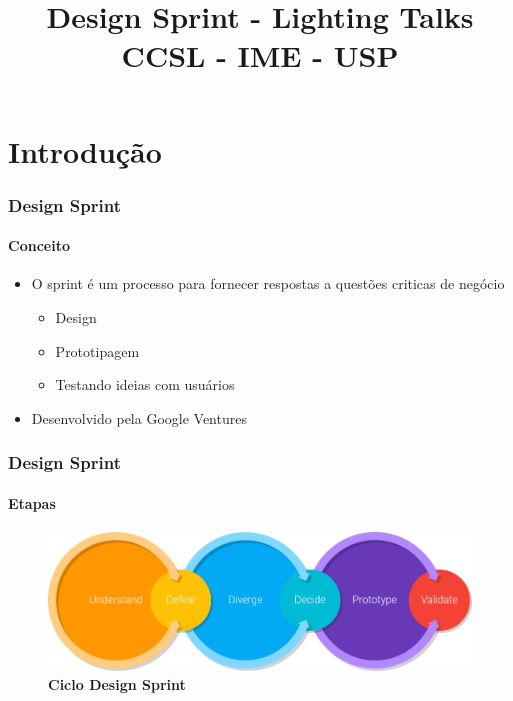 \documentclass{beamer}
\title{
  \textbf{Design Sprint - Lighting Talks} \\
  CCSL - IME - USP
}
\begin{document}
\maketitle

\section{Introdução}

\begin{frame}
  \frametitle{Design Sprint}
  \framesubtitle{Conceito}

  \begin{itemize}
    \item O sprint é um processo para fornecer respostas a questões criticas de negócio
      \begin{itemize}
        \item Design
          \vspace{.25cm}
        \item Prototipagem
          \vspace{.25cm}
        \item Testando ideias com usuários
      \end{itemize}
      \vspace{.5cm}
    \item Desenvolvido pela Google Ventures
  \end{itemize}
\end{frame}

\begin{frame}
  \frametitle{Design Sprint}
  \framesubtitle{Etapas}
  \begin{figure}
    \begin{center}
      \includegraphics[width=\textwidth]{home-DS-flow-ill.png}\\
      \textbf{Ciclo Design Sprint}
    \end{center}
  \end{figure}
\end{frame}
\end{document}
